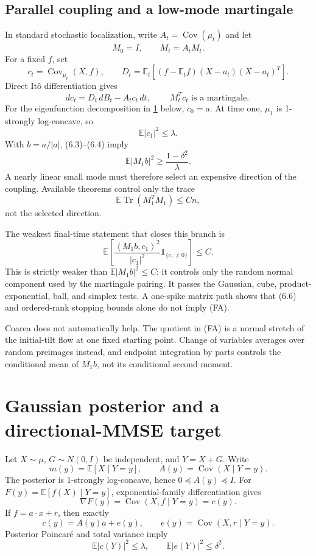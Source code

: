 \documentclass[11pt]{article}
\theoremstyle{definition}
\theoremstyle{remark}
\newcommand{\E}{\mathbb E}
\newcommand{\Cov}{\operatorname{Cov}}
\newcommand{\Tr}{\operatorname{Tr}}
\newcommand{\1}{\mathbf 1}
\newcommand{\dd}{\,d}
\newcommand{\ip}[2]{\left\langle #1,#2\right\rangle}
\begin{document}
\subsection{Parallel coupling and a low-mode martingale}

In standard stochastic localization, write \(A_t=\Cov(\mu_t)\) and let
\[
 M_0=I,\qquad \dot M_t=A_tM_t.
\]
For a fixed \(f\), set
\[
 c_t=\Cov_{\mu_t}(X,f),\qquad
 D_t=\E_t[(f-\E_tf)(X-a_t)(X-a_t)^T].
\]
Direct It\^o differentiation gives
\[
 dc_t=D_t\dd B_t-A_tc_t\dd t,
 \qquad
 \boxed{\ M_t^Tc_t\text{ is a martingale}.\ }        \tag{6.3}
\]
For the eigenfunction decomposition in \cref{sec:posterior} below,
\(c_0=a\).  At time one, \(\mu_1\) is 1-strongly log-concave, so
\[
                         \E|c_1|^2\le\lambda.         \tag{6.4}
\]
With \(b=a/|a|\), (6.3)--(6.4) imply
\[
 \boxed{\qquad
 \E|M_1b|^2\ge\frac{1-\delta^2}{\lambda}.
 \qquad}                                              \tag{6.5}
\]
A nearly linear small mode must therefore select an expensive direction
of the coupling.  Available theorems control only the trace
\[
                         \E\Tr(M_1^TM_1)\le Cn,        \tag{6.6}
\]
not the selected direction.

The weakest final-time statement that closes this branch is
\[
 \boxed{\quad
 \E\left[
 \frac{\ip{M_1b}{c_1}^2}{|c_1|^2}\1_{\{c_1\ne0\}}
 \right]\le C.
 \quad}                                               \tag{FA}
\]
This is strictly weaker than \(\E|M_1b|^2\le C\): it controls only the
random normal component used by the martingale pairing.  It passes the
Gaussian, cube, product-exponential, ball, and simplex tests.  A one-spike
matrix path shows that (6.6) and ordered-rank stopping bounds alone do not
imply (FA).

Coarea does not automatically help.  The quotient in (FA) is a normal
stretch of the initial-tilt flow at one fixed starting point.  Change of
variables averages over random preimages instead, and endpoint integration
by parts controls the conditional mean of \(M_1b\), not its conditional
second moment.

\section{Gaussian posterior and a directional-MMSE target}
\label{sec:posterior}

Let \(X\sim\mu\), \(G\sim N(0,I)\) be independent, and \(Y=X+G\).
Write
\[
 m(y)=\E[X\mid Y=y],\qquad
 A(y)=\Cov(X\mid Y=y).
\]
The posterior is 1-strongly log-concave, hence \(0\preceq A(y)\preceq I\).
For
\(F(y)=\E[f(X)\mid Y=y]\), exponential-family differentiation gives
\[
                         \nabla F(y)=\Cov(X,f\mid Y=y)=c(y). \tag{7.1}
\]
If \(f=a\cdot x+r\), then exactly
\[
                         c(y)=A(y)a+e(y),
 \qquad e(y)=\Cov(X,r\mid Y=y).                       \tag{7.2}
\]
Posterior Poincar\'e and total variance imply
\[
 \E|c(Y)|^2\le\lambda,
 \qquad
 \E|e(Y)|^2\le\delta^2.                              \tag{7.3}
\]
\end{document}

